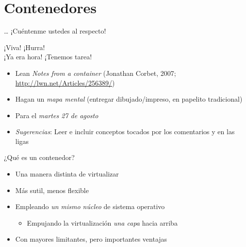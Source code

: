 \documentclass[presentation]{beamer}
\begin{document}
\section{Contenedores}
\label{sec:orgb9f5bd7}

\begin{frame}[label={sec:orgea8d3cc}]{\ldots{} ¡Cuéntenme ustedes al respecto!}
\begin{center}
{\huge ¡Viva! ¡Hurra!} \\ {\Large ¡Ya era hora! ¡Tenemos tarea!}
\end{center}
\vfill
\begin{itemize}
\item Lean \emph{Notes from a container} (Jonathan Corbet, 2007;
\url{http://lwn.net/Articles/256389/})
\item Hagan un \emph{mapa mental} (entregar dibujado/impreso, en papelito
tradicional)
\item Para el \emph{martes 27 de agosto}
\item \emph{Sugerencias}: Leer e incluir conceptos tocados por los comentarios
y en las ligas
\end{itemize}
\end{frame}

\begin{frame}[label={sec:org72c615d}]{¿Qué es un contenedor?}
\begin{itemize}
\item Una manera distinta de virtualizar
\item Más sutil, menos flexible
\item Empleando \emph{un mismo núcleo} de sistema operativo
\begin{itemize}
\item Empujando la virtualización \emph{una capa} hacia arriba
\end{itemize}
\item Con mayores limitantes, pero importantes ventajas
\end{itemize}
\end{frame}
\end{document}
